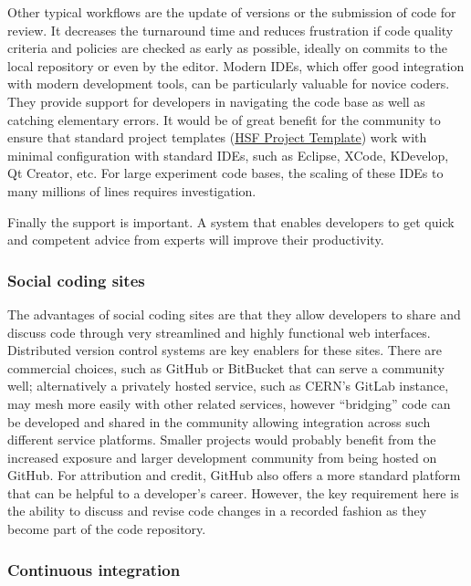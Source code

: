 \documentclass[12pt,a4paper]{article}
\begin{document}
Other typical workflows are the update of versions or the submission of
code for review. It decreases the turnaround time and reduces
frustration if code quality criteria and policies are checked as early
as possible, ideally on commits to the local repository or even by the
editor. Modern IDEs, which offer good integration with modern
development tools, can be particularly valuable for novice coders. They
provide support for developers in navigating the code base as well as
catching elementary errors. It would be of great benefit for the
community to ensure that standard project templates
(\href{https://github.com/HEP-SF/tools}{{HSF Project Template}}) work
with minimal configuration with standard IDEs, such as Eclipse, XCode,
KDevelop, Qt Creator, etc. For large experiment code bases, the scaling
of these IDEs to many millions of lines requires investigation.

Finally the support is important. A system that enables developers to
get quick and competent advice from experts will improve their
productivity.

\hypertarget{social-coding-sites}{%
\subsubsection{Social coding sites}\label{social-coding-sites}}

The advantages of social coding sites are that they allow developers to
share and discuss code through very streamlined and highly functional
web interfaces. Distributed version control systems are key enablers for
these sites. There are commercial choices, such as GitHub or BitBucket
that can serve a community well; alternatively a privately hosted
service, such as CERN's GitLab instance, may mesh more easily with other
related services, however ``bridging'' code can be developed and shared
in the community allowing integration across such different service
platforms. Smaller projects would probably benefit from the increased
exposure and larger development community from being hosted on GitHub.
For attribution and credit, GitHub also offers a more standard platform
that can be helpful to a developer's career. However, the key
requirement here is the ability to discuss and revise code changes in a
recorded fashion as they become part of the code repository.

\hypertarget{continuous-integration}{%
\subsubsection{Continuous integration}\label{continuous-integration}}
\end{document}
